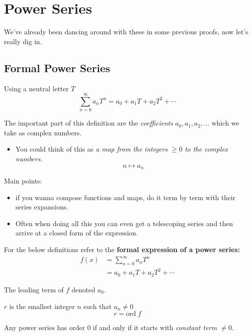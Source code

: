 \chapter{Power Series}
We've already been dancing around with these in some previous proofs, now let's really dig in. 
\section{Formal Power Series}
\begin{defn}
  Using a neutral letter $T$
  \[\sum_{n = 0}^{\infty}a_n T^n = a_0 + a_1 T + a_2 T^2 + \cdots \]
\end{defn}
The important part of this definition are the \textit{coefficients} $a_0, a_1, a_2, ...$ which we 
take as complex numbers.
\begin{itemize}
  \item You could think of this as \textit{a map from the integers} $ \geq 0 $ \textit{to the complex numbers.}
  \[n \mapsto a_n \]
\end{itemize}

Main points: 
  \begin{itemize}
    \item if you wanna compose functions and maps, do it term by term with their series expansions.
    \item Often when doing all this you can even get a telescoping series and then arrive at a closed form of the expression. \\
  \end{itemize}

For the below definitions refer to the \textbf{formal expression of a power series:}
\begin{align*}
  f(x) &= \sum_{n = 0}^{\infty} a_n T^n \\
  &= a_0 + a_1 T + a_2 T^2 + \cdots
\end{align*}
\begin{defn}
  The leading term of $f$ denoted $a_0$.
\end{defn}

\begin{defn}
  $r$ is the smallest integer $n$ such that $a_n \not = 0$
  \[r = \text{ord}\; f\]
\end{defn}

\begin{thm}
  Any power series has order $0$ if and only if it starts with \textit{constant term} $\not = 0.$
\end{thm}

